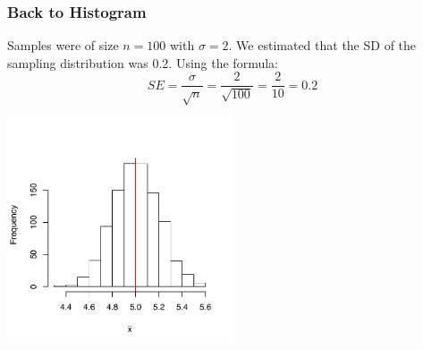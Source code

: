\documentclass[slides]{beamer}
\begin{document}
\begin{frame}[fragile]
\frametitle{Back to Histogram}
Samples were of size $n=100$ with $\sigma=2$.  We estimated that the SD of the sampling distribution was 0.2.  Using the formula:
\[
SE = \frac{\sigma}{\sqrt{n}} = \frac{2}{\sqrt{100}} = \frac{2}{10} = 0.2
\]
\begin{center}
\includegraphics[width=0.5\textwidth]{figure/lec12-001}
\end{center}


\end{frame}
\end{document}
